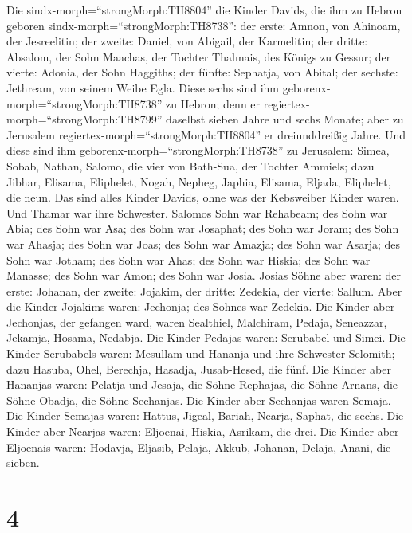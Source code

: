  Die sindx-morph=``strongMorph:TH8804'' die Kinder Davids,
die ihm zu Hebron geboren sindx-morph=``strongMorph:TH8738'': der erste:
Amnon, von Ahinoam, der Jesreelitin; der zweite: Daniel, von Abigail,
der Karmelitin;  der dritte: Absalom, der Sohn Maachas, der
Tochter Thalmais, des Königs zu Gessur; der vierte: Adonia, der Sohn
Haggiths;  der fünfte: Sephatja, von Abital; der sechste:
Jethream, von seinem Weibe Egla.  Diese sechs sind ihm
geborenx-morph=``strongMorph:TH8738'' zu Hebron; denn er
regiertex-morph=``strongMorph:TH8799'' daselbst sieben Jahre und sechs
Monate; aber zu Jerusalem regiertex-morph=``strongMorph:TH8804'' er
dreiunddreißig Jahre.  Und diese sind ihm
geborenx-morph=``strongMorph:TH8738'' zu Jerusalem: Simea, Sobab,
Nathan, Salomo, die vier von Bath-Sua, der Tochter Ammiels; 
dazu Jibhar, Elisama, Eliphelet,  Nogah, Nepheg, Japhia,
 Elisama, Eljada, Eliphelet, die neun.  Das sind
alles Kinder Davids, ohne was der Kebsweiber Kinder waren. Und Thamar
war ihre Schwester.  Salomos Sohn war Rehabeam; des Sohn
war Abia; des Sohn war Asa; des Sohn war Josaphat;  des
Sohn war Joram; des Sohn war Ahasja; des Sohn war Joas; 
des Sohn war Amazja; des Sohn war Asarja; des Sohn war Jotham;
 des Sohn war Ahas; des Sohn war Hiskia; des Sohn war
Manasse;  des Sohn war Amon; des Sohn war Josia.
 Josias Söhne aber waren: der erste: Johanan, der zweite:
Jojakim, der dritte: Zedekia, der vierte: Sallum.  Aber die
Kinder Jojakims waren: Jechonja; des Sohnes war Zedekia. 
Die Kinder aber Jechonjas, der gefangen ward, waren Sealthiel,
 Malchiram, Pedaja, Seneazzar, Jekamja, Hosama, Nedabja.
 Die Kinder Pedajas waren: Serubabel und Simei. Die Kinder
Serubabels waren: Mesullam und Hananja und ihre Schwester Selomith;
 dazu Hasuba, Ohel, Berechja, Hasadja, Jusab-Hesed, die
fünf.  Die Kinder aber Hananjas waren: Pelatja und Jesaja,
die Söhne Rephajas, die Söhne Arnans, die Söhne Obadja, die Söhne
Sechanjas.  Die Kinder aber Sechanjas waren Semaja. Die
Kinder Semajas waren: Hattus, Jigeal, Bariah, Nearja, Saphat, die sechs.
 Die Kinder aber Nearjas waren: Eljoenai, Hiskia, Asrikam,
die drei.  Die Kinder aber Eljoenais waren: Hodavja,
Eljasib, Pelaja, Akkub, Johanan, Delaja, Anani, die sieben.

\hypertarget{section-3}{%
\section{4}\label{section-3}}


